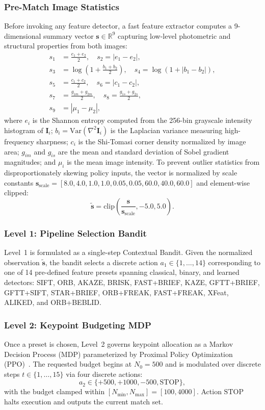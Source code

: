 \documentclass[conference]{IEEEtran}
\begin{document}
\subsubsection{Pre-Match Image Statistics}
Before invoking any feature detector, a fast feature extractor computes a 9-dimensional summary vector $\mathbf{s} \in \mathbb{R}^9$ capturing low-level photometric and structural properties from both images:
\begin{align}
s_1 &= \frac{e_1 + e_2}{2}, \quad s_2 = |e_1 - e_2|, \\
s_3 &= \log\left(1 + \frac{b_1 + b_2}{2}\right), \quad s_4 = \log(1 + |b_1 - b_2|), \\
s_5 &= \frac{c_1 + c_2}{2}, \quad s_6 = |c_1 - c_2|, \\
s_7 &= \frac{g_{1m} + g_{2m}}{2}, \quad s_8 = \frac{g_{1s} + g_{2s}}{2}, \\
s_9 &= |\mu_1 - \mu_2|,
\end{align}
where $e_i$ is the Shannon entropy computed from the 256-bin grayscale intensity histogram of $\mathbf{I}_i$; $b_i = \mathrm{Var}(\nabla^2 \mathbf{I}_i)$ is the Laplacian variance measuring high-frequency sharpness; $c_i$ is the Shi-Tomasi corner density normalized by image area; $g_{im}$ and $g_{is}$ are the mean and standard deviation of Sobel gradient magnitudes; and $\mu_i$ is the mean image intensity. To prevent outlier statistics from disproportionately skewing policy inputs, the vector is normalized by scale constants $\mathbf{s}_{\text{scale}} = [8.0, 4.0, 1.0, 1.0, 0.05, 0.05, 60.0, 40.0, 60.0]$ and element-wise clipped:
\begin{equation}
\mathbf{\tilde{s}} = \mathrm{clip}\left(\frac{\mathbf{s}}{\mathbf{s}_{\text{scale}}}, -5.0, 5.0\right).
\end{equation}

\subsubsection{Level 1: Pipeline Selection Bandit}
Level~1 is formulated as a single-step Contextual Bandit. Given the normalized observation $\mathbf{\tilde{s}}$, the bandit selects a discrete action $a_1 \in \{1, \dots, 14\}$ corresponding to one of 14 pre-defined feature presets spanning classical, binary, and learned detectors: SIFT, ORB, AKAZE, BRISK, FAST+BRIEF, KAZE, GFTT+BRIEF, GFTT+SIFT, STAR+BRIEF, ORB+FREAK, FAST+FREAK, XFeat, ALIKED, and ORB+BEBLID.

\subsubsection{Level 2: Keypoint Budgeting MDP}
Once a preset is chosen, Level~2 governs keypoint allocation as a Markov Decision Process (MDP) parameterized by Proximal Policy Optimization (PPO)~\cite{schulman2017ppo}. The requested budget begins at $N_0 = 500$ and is modulated over discrete steps $t \in \{1, \dots, 15\}$ via four discrete actions:
\begin{equation}
a_2 \in \{+500, +1000, -500, \mathrm{STOP}\},
\end{equation}
with the budget clamped within $[N_{\min}, N_{\max}] = [100, 4000]$. Action $\mathrm{STOP}$ halts execution and outputs the current match set.
\end{document}
